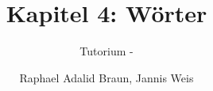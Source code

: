 \documentclass[18pt]{beamer}
\title[Wörter]{Kapitel 4: Wörter}
\subtitle{Tutorium - } %
\author{Raphael Adalid Braun, Jannis Weis}
\institute{Grundbegriffe der Informatik | WS 2018/19}
\begin{document}

\begin{frame}
	\titlepage
\end{frame}


\end{document}
